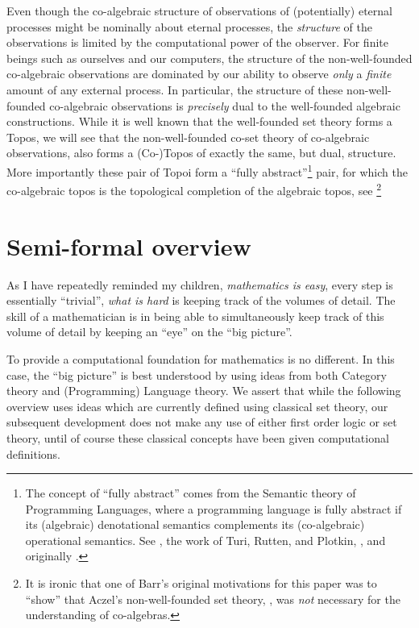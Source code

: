 Even though the co-algebraic structure of observations of (potentially) eternal
processes might be nominally about eternal processes, the \emph{structure} of
the observations is limited by the computational power of the observer. For
finite beings such as ourselves and our computers, the structure of the
non-well-founded co-algebraic observations are dominated by our ability to
observe \emph{only}  a \emph{finite} amount of any external process. In
particular, the structure of these non-well-founded co-algebraic observations is
\emph{precisely} dual to the well-founded algebraic constructions.  While it is
well known that the well-founded set theory forms a Topos, we will see that the
non-well-founded co-set theory of co-algebraic observations, also forms a
(Co-)Topos of exactly the same, but dual, structure. More importantly these pair
of Topoi form a ``fully abstract''\footnote{The concept of ``fully abstract''
comes from the Semantic theory of Programming Languages, where a programming
language is fully abstract if its (algebraic) denotational semantics complements
its (co-algebraic) operational semantics. See \cite[Section
2.4]{jacobs2012coalg}, the work of Turi, Rutten, and Plotkin,
\cite{turiRutten1998finalSemantics, turi1996operationalSemantics,
turiPlotkin1997operationalSemantics}, and originally \cite{plotkin1977lcf}.}
pair, for which the co-algebraic topos is the topological completion of the
algebraic topos, see \cite{barr1993terminalCoalgebrasWellFounded}\footnote{It is
ironic that one of Barr's original motivations for this paper was to ``show''
that Aczel's non-well-founded set theory, \cite{aczel1988nonWellFoundedSets},
was \emph{not} necessary for the understanding of co-algebras.}

\section{Semi-formal overview}

As I have repeatedly reminded my children, \emph{mathematics is easy}, every
step is essentially ``trivial'', \emph{what is hard} is keeping track of the
volumes of detail. The skill of a mathematician is in being able to
simultaneously keep track of this volume of detail by keeping an ``eye'' on the
``big picture''. 

To provide a computational foundation for mathematics is no different. In this
case, the ``big picture'' is best understood by using ideas from both Category
theory and (Programming) Language theory. We assert that while the following
overview uses ideas which are currently defined using classical set theory, our
subsequent development does not make any use of either first order logic or set
theory, until of course these classical concepts have been given computational
definitions.

